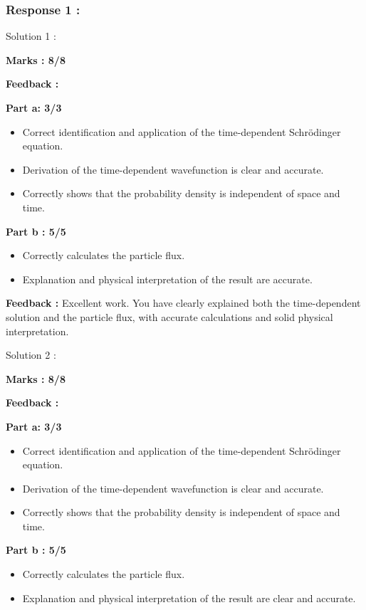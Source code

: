 \documentclass[a4paper,11pt]{article}
\begin{document}
\subsubsection*{Response 1 :}

Solution 1 :

\textbf{Marks : 8/8}

\textbf{Feedback :}

\textbf{Part a: 3/3}
\begin{itemize}
    \item Correct identification and application of the time-dependent Schrödinger equation.
    \item Derivation of the time-dependent wavefunction is clear and accurate.
    \item Correctly shows that the probability density is independent of space and time.
\end{itemize}

\textbf{Part b : 5/5}
\begin{itemize}
    \item Correctly calculates the particle flux.
    \item Explanation and physical interpretation of the result are accurate.
\end{itemize}

\textbf{Feedback :}
Excellent work. You have clearly explained both the time-dependent solution and the particle flux, with accurate calculations and solid physical interpretation.


Solution 2 :

\textbf{Marks : 8/8}

\textbf{Feedback :}

\textbf{Part a: 3/3}
\begin{itemize}
    \item Correct identification and application of the time-dependent Schrödinger equation.
    \item Derivation of the time-dependent wavefunction is clear and accurate.
    \item Correctly shows that the probability density is independent of space and time.
\end{itemize}

\textbf{Part b : 5/5}

\begin{itemize}
    \item Correctly calculates the particle flux.
    \item Explanation and physical interpretation of the result are clear and accurate.
\end{itemize}
\end{document}

